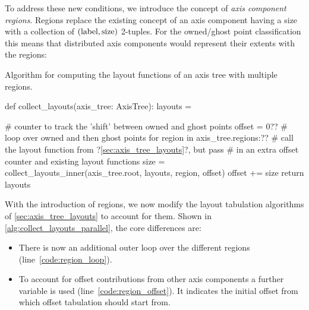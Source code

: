 \documentclass[thesis]{subfiles}
\begin{document}
To address these new conditions, we introduce the concept of \emph{axis component regions}.
Regions replace the existing concept of an axis component having a size with a collection of $(\textnormal{label}, \textnormal{size})$ 2-tuples.
For the owned/ghost point classification this means that distributed axis components would represent their extents with the regions:
\begin{pyinline}
\end{pyinline}

\begin{algorithm}
  \caption{
    Algorithm for computing the layout functions of an axis tree with multiple regions.
  }
  \begin{center}
    \begin{minipage}{.9\textwidth}
      \begin{pyalg2}
        def collect_layouts(axis_tree: AxisTree):
          layouts = {}

          # counter to track the 'shift' between owned and ghost points
          offset = 0?\label{code:region_offset}?
          # loop over owned and then ghost points
          for region in axis_tree.regions:?\label{code:region_loop}?
            # call the layout function from ?\cref{sec:axis_tree_layouts}?, but pass
            # in an extra offset counter and existing layout functions
            size = collect_layouts_inner(axis_tree.root, layouts,
                                         region, offset)
            offset += size
          return layouts
      \end{pyalg2}
    \end{minipage}
  \end{center}
  \label{alg:collect_layouts_parallel}
\end{algorithm}

With the introduction of regions, we now modify the layout tabulation algorithms of \cref{sec:axis_tree_layouts} to account for them.
Shown in \cref{alg:collect_layouts_parallel}, the core differences are:
\begin{itemize}
  \item
    There is now an additional outer loop over the different regions (line~\ref{code:region_loop}).
  \item
    To account for offset contributions from other axis components a further  variable is used (line~\ref{code:region_offset}).
    It indicates the initial offset from which offset tabulation should start from.
\end{itemize}
\end{document}
